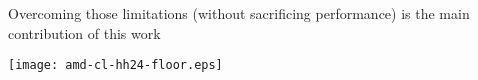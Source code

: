 \documentclass[xcolor=dvipsnames]{beamer}
\begin{document}
\begin{frame}
  \begin{center}
    Overcoming those limitations (without sacrificing performance) is the main contribution of this work
  \end{center}
\end{frame}

\begin{frame}
  \begin{center}
    \texttt{[image: amd-cl-hh24-floor.eps]}
  \end{center}
\end{frame}















\end{document}
